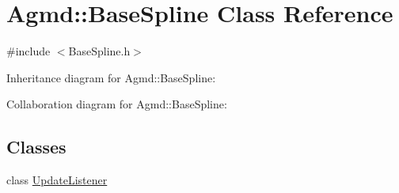 \hypertarget{class_agmd_1_1_base_spline}{\section{Agmd\+:\+:Base\+Spline Class Reference}
\label{class_agmd_1_1_base_spline}
}


{\ttfamily \#include $<$Base\+Spline.\+h$>$}



Inheritance diagram for Agmd\+:\+:Base\+Spline\+:


Collaboration diagram for Agmd\+:\+:Base\+Spline\+:
\subsection*{Classes}
\begin{DoxyCompactItemize}
\item 
class \hyperlink{class_agmd_1_1_base_spline_1_1_update_listener}{Update\+Listener}
\end{DoxyCompactItemize}
